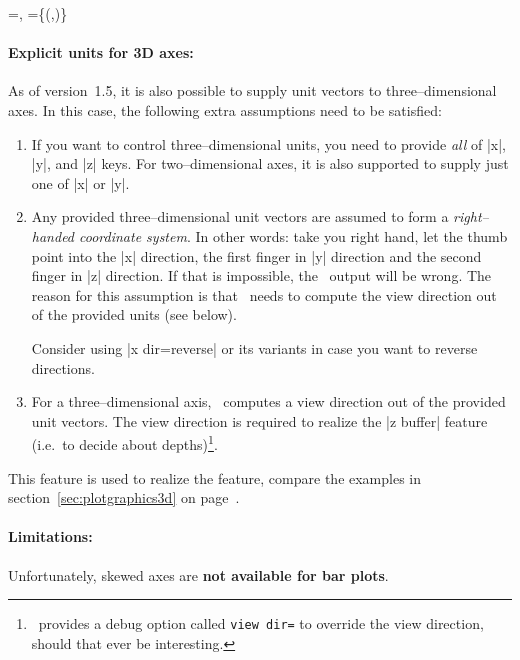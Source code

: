 \begin{pgfplotsxykeylist}{
	\x=,
	\x={\{(,)\}}}
\paragraph{Explicit units for 3D axes:} As of version~1.5, it is also possible to supply unit vectors to three--dimensional axes. In this case, the following extra assumptions need to be satisfied:
\begin{enumerate}
	\item If you want to control three--dimensional units, you need to provide \emph{all} of |x|, |y|, and |z| keys. For two--dimensional axes, it is also supported to supply just one of |x| or |y|.
	\item Any provided three--dimensional unit vectors are assumed to form a \emph{right--handed coordinate system}. In other words: take you right hand, let the thumb point into the |x| direction, the first finger in |y| direction and the second finger in |z| direction. If that is impossible, the \PGFPlots\ output will be wrong. The reason for this assumption is that \PGFPlots\ needs to compute the view direction out of the provided units (see below).

	Consider using |x dir=reverse| or its variants in case you want to reverse directions.

	\item For a three--dimensional axis, \PGFPlots\ computes a view direction out of the provided unit vectors. The view direction is required to realize the |z buffer| feature (i.e.\ to decide about depths)\footnote{\PGFPlots\ provides a debug option called \texttt{view dir=} to override the view direction, should that ever be interesting.}.
\end{enumerate}
This feature is used to realize the  feature, compare the examples in section~\ref{sec:plotgraphics3d} on page~\pageref{sec:plotgraphics3d}.

\paragraph{Limitations:} Unfortunately, skewed axes are \textbf{not available for bar plots}.
%
%
\end{pgfplotsxykeylist}

